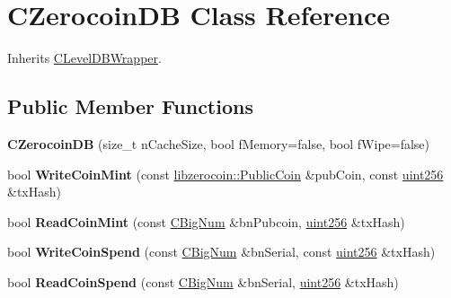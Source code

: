 \hypertarget{class_c_zerocoin_d_b}{}\section{C\+Zerocoin\+DB Class Reference}
\label{class_c_zerocoin_d_b}


Inherits \mbox{\hyperlink{class_c_level_d_b_wrapper}{C\+Level\+D\+B\+Wrapper}}.

\subsection*{Public Member Functions}
\begin{DoxyCompactItemize}
\item 
\mbox{\label{class_c_zerocoin_d_b_ac955b184e894c817500fc11db0ec2670}} 
{\bfseries C\+Zerocoin\+DB} (size\+\_\+t n\+Cache\+Size, bool f\+Memory=false, bool f\+Wipe=false)
\item 
\mbox{\label{class_c_zerocoin_d_b_a58b78fd953536c0ad59e5193bcffabe7}} 
bool {\bfseries Write\+Coin\+Mint} (const \mbox{\hyperlink{classlibzerocoin_1_1_public_coin}{libzerocoin\+::\+Public\+Coin}} \&pub\+Coin, const \mbox{\hyperlink{classuint256}{uint256}} \&tx\+Hash)
\item 
\mbox{\label{class_c_zerocoin_d_b_a90b0f4aecbbbe57b1b9cad6e1c37ec15}} 
bool {\bfseries Read\+Coin\+Mint} (const \mbox{\hyperlink{class_c_big_num}{C\+Big\+Num}} \&bn\+Pubcoin, \mbox{\hyperlink{classuint256}{uint256}} \&tx\+Hash)
\item 
\mbox{\label{class_c_zerocoin_d_b_a8beb2643c918d7493f0fa3f773781b21}} 
bool {\bfseries Write\+Coin\+Spend} (const \mbox{\hyperlink{class_c_big_num}{C\+Big\+Num}} \&bn\+Serial, const \mbox{\hyperlink{classuint256}{uint256}} \&tx\+Hash)
\item 
\mbox{\label{class_c_zerocoin_d_b_abd5c1b53d5ed33d4196010e51e2b8cbb}} 
bool {\bfseries Read\+Coin\+Spend} (const \mbox{\hyperlink{class_c_big_num}{C\+Big\+Num}} \&bn\+Serial, \mbox{\hyperlink{classuint256}{uint256}} \&tx\+Hash)
\item 
\mbox{\label{class_c_zerocoin_d_b_acdef7b13610bd8f4ad5f4a3d5b314e33}} 

\end{DoxyCompactItemize}
